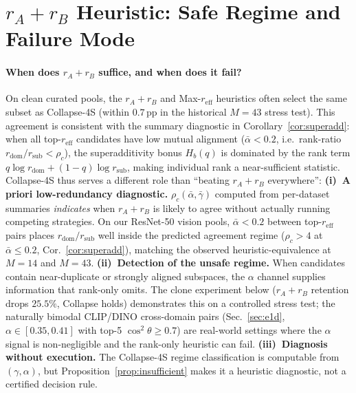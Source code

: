 \documentclass{article}
\newcommand{\reff}{\ensuremath{r_{\mathrm{eff}}}\xspace}
\begin{document}
\section{$r_A{+}r_B$ Heuristic: Safe Regime and Failure Mode}
\label{app:rsum_regime}

\paragraph{When does $r_A{+}r_B$ suffice, and when does it fail?}
On clean curated pools, the $r_A{+}r_B$ and Max-$\reff$ heuristics
often select the same subset as Collapse-4S (within $0.7$\,pp in the
historical $M{=}43$ stress test).
This agreement is consistent with the summary diagnostic in
Corollary~\ref{cor:superadd}: when all top-$\reff$ candidates have low
mutual alignment ($\bar\alpha{<}0.2$, i.e.\ rank-ratio $r_{\mathrm{dom}}/r_{\mathrm{sub}}{<}\rho_c$),
the superadditivity bonus $H_b(q)$ is dominated by the rank term
$q\log r_{\mathrm{dom}}{+}(1{-}q)\log r_{\mathrm{sub}}$,
making individual rank a near-sufficient statistic.
Collapse-4S thus serves a different role than ``beating $r_A{+}r_B$
everywhere'':
\textbf{(i)~A priori low-redundancy diagnostic.}
$\rho_c(\bar\alpha,\bar\gamma)$ computed from per-dataset summaries
\emph{indicates} when $r_A{+}r_B$ is likely to agree without actually
running competing strategies.
On our ResNet-50 vision pools, $\bar\alpha{<}0.2$ between top-$\reff$
pairs places $r_{\mathrm{dom}}/r_{\mathrm{sub}}$ well inside the predicted
agreement regime ($\rho_c{>}4$ at $\bar\alpha{\leq}0.2$,
Cor.~\ref{cor:superadd}), matching the observed heuristic-equivalence
at $M{=}14$ and $M{=}43$.
\textbf{(ii)~Detection of the unsafe regime.}
When candidates contain near-duplicate or strongly aligned subspaces, the
$\alpha$ channel supplies information that rank-only omits.
The clone experiment below ($r_A{+}r_B$ retention drops $25.5\%$,
Collapse holds) demonstrates this on a controlled stress test;
the naturally bimodal CLIP/DINO cross-domain pairs
(Sec.~\ref{sec:e1d}, $\alpha\in[0.35,0.41]$ with top-5 $\cos^2\theta\geq0.7$)
are real-world settings where the $\alpha$ signal is non-negligible
and the rank-only heuristic can fail.
\textbf{(iii)~Diagnosis without execution.}
The Collapse-4S regime classification is computable from $(\gamma,\alpha)$,
but Proposition~\ref{prop:insufficient} makes it a heuristic diagnostic, not
a certified decision rule.
\end{document}
